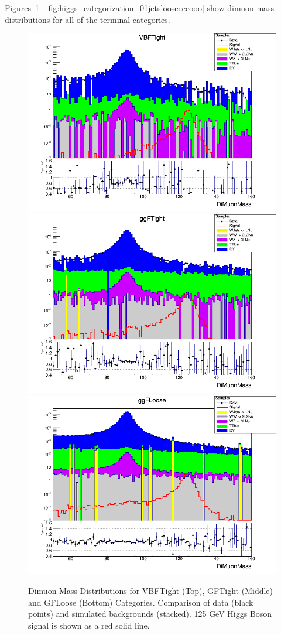 Figures~\ref{fig:higgs_categorization_2jetsall}-~\ref{fig:higgs_categorization_01jetslooseeeeooo} show dimuon mass distributions for all of the terminal categories.
\begin{figure}[htbp]
  \centering
  \includegraphics[width=0.65\linewidth]{figures/ch_higgs/distributions/baseline_kalman/distribution__VBFTight__DiMuonMass__logY.png}\\
  \includegraphics[width=0.65\linewidth]{figures/ch_higgs/distributions/baseline_kalman/distribution__ggFTight__DiMuonMass__logY.png}\\
  \includegraphics[width=0.65\linewidth]{figures/ch_higgs/distributions/baseline_kalman/distribution__ggFLoose__DiMuonMass__logY.png}
  \caption{Dimuon Mass Distributions for VBFTight (Top), GFTight (Middle) and GFLoose (Bottom) Categories. Comparison of data (black points) and simulated backgrounds (stacked). 125 GeV Higgs Boson signal is shown as a red solid line.}
  \label{fig:higgs_categorization_2jetsall}
\end{figure}

